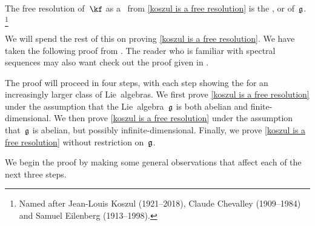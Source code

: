 \begin{definition}
	The free resolution of~$\kf$ as a~\module{$\Univ(\glie)$} from \cref{koszul is a free resolution} is the , or  of~$\mathfrak{g}$.%
	\footnote{
		Named after Jean-Louis Koszul (1921--2018), Claude Chevalley (1909--1984) and Samuel Eilenberg (1913--1998).
	}
\end{definition}


\begin{fluff}
	We will spend the rest of this  on proving \cref{koszul is a free resolution}.
	We have taken the following proof from \cite[IV.6]{knapp_lie_and_cohomology}.
	The reader who is familiar with spectral sequences may also want check out the proof given in \cite[Theorem~7.2.2]{weibel_homological_algebra}.

	The proof will proceed in four steps, with each step showing the  for an increasingly larger class of Lie~algebras.
	We first prove \cref{koszul is a free resolution} under the assumption that the Lie~algebra~$\mathfrak{g}$ is both abelian and finite-dimensional.
	We then prove \cref{koszul is a free resolution} under the assumption that~$\mathfrak{g}$ is abelian, but possibly infinite-dimensional.
	Finally, we prove \cref{koszul is a free resolution} without restriction on~$\mathfrak{g}$.

	We begin the proof by making some general observations that affect each of the next three steps.
\end{fluff}


